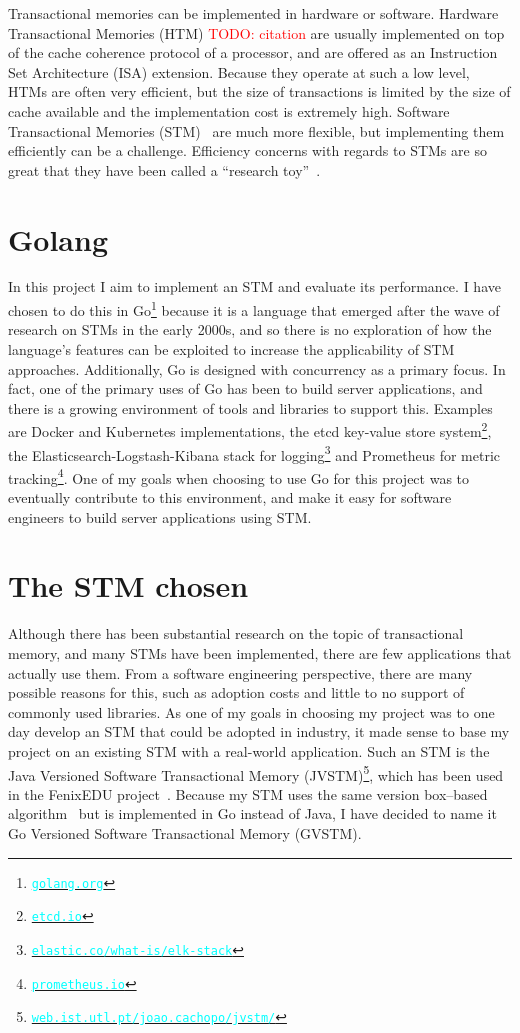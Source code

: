\documentclass[12pt,a4paper,oneside,openright]{report}
\newcommand{\URL}[1]{\href{https://#1}{\textcolor{cyan}{\texttt{#1}}}}
\newcommand{\todo}[1]{\textcolor{red}{TODO: #1}}
\begin{document}
Transactional memories can be implemented in hardware or
software. Hardware Transactional Memories (HTM) \todo{citation} are
usually implemented on top of the cache coherence protocol of a
processor, and are offered as an Instruction Set Architecture (ISA)
extension. Because they operate at such a low level, HTMs are often
very efficient, but the size of transactions is limited by the size of
cache available and the implementation cost is extremely
high. Software Transactional Memories (STM)~\cite{STM} are much more
flexible, but implementing them efficiently can be a
challenge. Efficiency concerns with regards to STMs are so great that
they have been called a ``research toy''~\cite{Toy}.

\section{Golang}
\label{sec:intro:golang}

In this project I aim to implement an STM and evaluate its
performance. I have chosen to do this in Go\footnote{\URL{golang.org}}
because it is a language that emerged after the wave of research on
STMs in the early 2000s, and so there is no exploration of how the
language's features can be exploited to increase the applicability of
STM approaches. Additionally, Go is designed with concurrency as a
primary focus. In fact, one of the primary uses of Go has been to
build server applications, and there is a growing environment of tools
and libraries to support this. Examples are Docker and Kubernetes
implementations, the etcd key-value store
system\footnote{\URL{etcd.io}}, the Elasticsearch-Logstash-Kibana
stack for logging\footnote{\URL{elastic.co/what-is/elk-stack}} and
Prometheus for metric tracking\footnote{\URL{prometheus.io}}. One of
my goals when choosing to use Go for this project was to eventually
contribute to this environment, and make it easy for software
engineers to build server applications using STM.

\section{The STM chosen}
\label{sec:stm-chosen}

Although there has been substantial research on the topic of
transactional memory, and many STMs have been implemented, there are
few applications that actually use them. From a software engineering
perspective, there are many possible reasons for this, such as
adoption costs and little to no support of commonly used libraries. As
one of my goals in choosing my project was to one day develop an STM
that could be adopted in industry, it made sense to base my project on
an existing STM with a real-world application. Such an STM is the Java
Versioned Software Transactional Memory
(JVSTM)\footnote{\URL{web.ist.utl.pt/joao.cachopo/jvstm/}}, which has
been used in the FenixEDU
project~\cite{carvalho2008versioned}. Because my STM uses the same
version box--based algorithm~\cite{VBox} but is implemented in Go
instead of Java, I have decided to name it Go Versioned Software
Transactional Memory (GVSTM).
\end{document}

